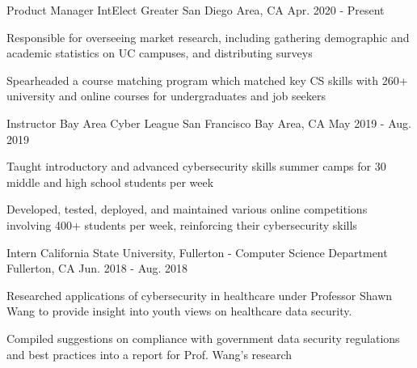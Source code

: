 

\begin{cventries}

\cventry
{Product Manager} %
{IntElect} %
{Greater San Diego Area, CA} %
{Apr. 2020 - Present} %
{
  \begin{cvitems} %
    \item {Responsible for overseeing market research, including gathering demographic and academic statistics on UC campuses, and distributing surveys}
    \item {Spearheaded a course matching program which matched key CS skills with 260+ university and online courses for undergraduates and job seekers}
  \end{cvitems}
}

  \cventry
    {Instructor} %
    {Bay Area Cyber League} %
    {San Francisco Bay Area, CA} %
    {May 2019 - Aug. 2019} %
    {
      \begin{cvitems} %
        \item {Taught introductory and advanced cybersecurity skills summer camps for 30 middle and high school students per week}
        \item {Developed, tested, deployed, and maintained various online competitions involving 400+ students per week, reinforcing their cybersecurity skills}
      \end{cvitems}
    }

  \cventry
    {Intern} %
    {California State University, Fullerton - Computer Science Department} %
    {Fullerton, CA} %
    {Jun. 2018 - Aug. 2018} %
    {
      \begin{cvitems} %
        \item {Researched applications of cybersecurity in healthcare under Professor Shawn Wang to provide insight into youth views on healthcare data security.}
        \item {Compiled suggestions on compliance with government data security regulations and best practices into a report for Prof. Wang's research}
      \end{cvitems}
    }

\end{cventries}
